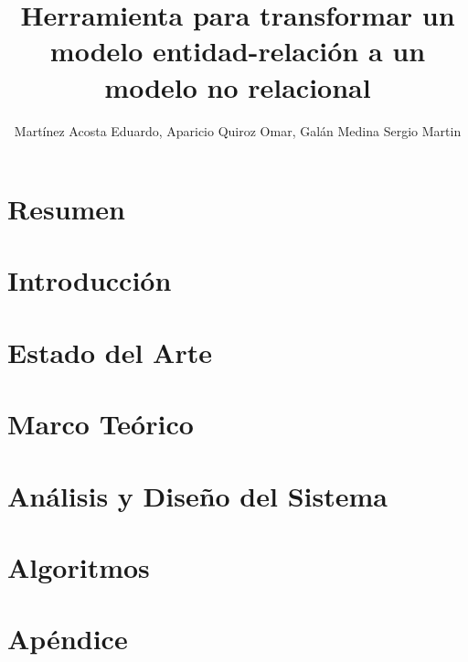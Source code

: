 \documentclass[12pt, a4paper]{report}
\title{Herramienta para transformar un modelo entidad-relación a un modelo no relacional}
\author{Martínez Acosta Eduardo, Aparicio Quiroz Omar, Galán Medina Sergio Martin}
\theoremstyle{definition}
\theoremstyle{remark}
\begin{document}


\tableofcontents
\listoffigures
\listoftables

\chapter*{Resumen}
\chapter{Introducción}

\chapter{Estado del Arte}

\chapter{Marco Teórico}

\chapter{Análisis y Diseño del Sistema}

\chapter{Algoritmos}

% 
\appendix
\chapter{Apéndice}
 
 

\printbibliography
\end{document}
